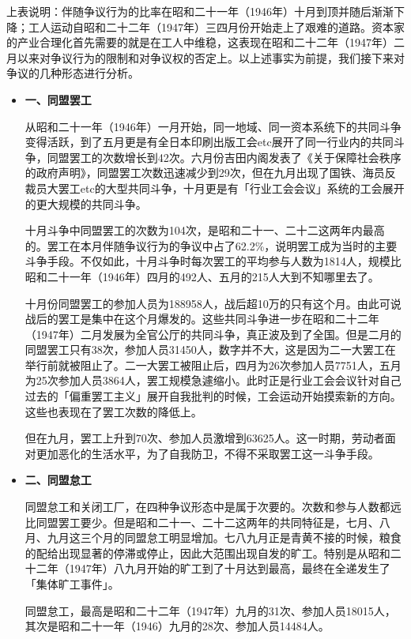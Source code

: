 \documentclass[a4paper,12pt]{article}
\begin{document}
上表说明：伴随争议行为的比率在昭和二十一年（1946年）十月到顶并随后渐渐下降；工人运动自昭和二十二年（1947年）三四月份开始走上了艰难的道路。资本家的产业合理化首先需要的就是在工人中维稳，这表现在昭和二十二年（1947年）二月以来对争议行为的限制和对争议权的否定上。以上述事实为前提，我们接下来对争议的几种形态进行分析。

\begin{itemize}
\item \textbf{一、同盟罢工}

  从昭和二十一年（1946年）一月开始，同一地域、同一资本系统下的共同斗争变得活跃，到了五月更是有全日本印刷出版工会etc展开了同一行业内的共同斗争，同盟罢工的次数增长到42次。六月份吉田内阁发表了《关于保障社会秩序的政府声明》，同盟罢工次数迅速减少到29次，但在九月出现了国铁、海员反裁员大罢工etc的大型共同斗争，十月更是有「行业工会会议」系统的工会展开的更大规模的共同斗争。

  十月斗争中同盟罢工的次数为104次，是昭和二十一、二十二这两年内最高的。罢工在本月伴随争议行为的争议中占了62.2\%，说明罢工成为当时的主要斗争手段。不仅如此，十月斗争时每次罢工的平均参与人数为1814人，规模比昭和二十一年（1946年）四月的492人、五月的215人大到不知哪里去了。

  十月份同盟罢工的参加人员为188958人，战后超10万的只有这个月。由此可说战后的罢工是集中在这个月爆发的。这些共同斗争进一步在昭和二十二年（1947年）二月发展为全官公厅的共同斗争，真正波及到了全国。但是二月的同盟罢工只有38次，参加人员31450人，数字并不大，这是因为二一大罢工在举行前就被阻止了。二一大罢工被阻止后，四月为26次参加人员7751人，五月为25次参加人员3864人，罢工规模急遽缩小。此时正是行业工会会议针对自己过去的「偏重罢工主义」展开自我批判的时候，工会运动开始摸索新的方向。这些也表现在了罢工次数的降低上。

  但在九月，罢工上升到70次、参加人员激增到63625人。这一时期，劳动者面对更加恶化的生活水平，为了自我防卫，不得不采取罢工这一斗争手段。

\item \textbf{二、同盟怠工}

  同盟怠工和关闭工厂，在四种争议形态中是属于次要的。次数和参与人数都远比同盟罢工要少。但是昭和二十一、二十二这两年的共同特征是，七月、八月、九月这三个月的同盟怠工明显增加。七八九月正是青黄不接的时候，粮食的配给出现显著的停滞或停止，因此大范围出现自发的旷工。特别是从昭和二十二年（1947年）八九月开始的旷工到了十月达到最高，最终在全递发生了「集体旷工事件」。

  同盟怠工，最高是昭和二十二年（1947年）九月的31次、参加人员18015人，其次是昭和二十一年（1946）九月的28次、参加人员14484人。


\end{itemize}
\end{document}
